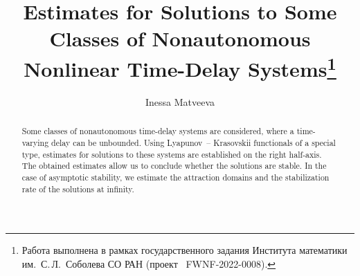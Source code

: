 
\begin{englishtitle} %
\title{Estimates for Solutions to Some Classes of Nonautonomous Nonlinear Time-Delay Systems\thanks{Работа
выполнена в рамках государственного задания
Института математики им.~С.\,Л.~Соболева СО РАН 
(проект \textnumero~FWNF-2022-0008).
}}
\author{Inessa Matveeva%
}

\maketitle

\begin{abstract}
Some classes of nonautonomous time-delay systems are considered,
where a time-varying delay can be unbounded.
Using Lyapunov~-- Krasovskii functionals of a special type,
estimates for solutions to these systems are established on the right half-axis.
The obtained estimates allow us to conclude whether the solutions are stable.
In the case of asymptotic stability, we estimate the attraction domains
and the stabilization rate of the solutions at infinity.

\end{abstract}
\end{englishtitle}

\iffalse
%
%

